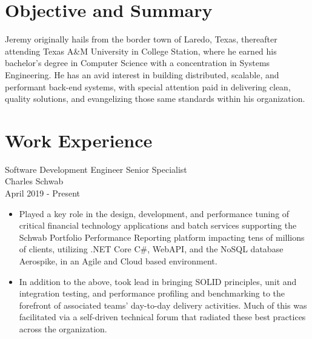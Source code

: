 \documentclass[11pt]{res} %
\begin{document}
 
 

\address{{\bf Current Address} \\   2912 Sebring Circle \\   Austin, TX
         78747  \\ (956)286-8386}
\address{{\bf Contact Information} \\ jeremycantu.com \\ github.com/jac21 \\ mail@jeremycantu.com}
 
                                             
\begin{resume}
                                               
 
\section{Objective and Summary}
   Jeremy originally hails from the border town of Laredo, Texas, thereafter attending Texas A\&M University in College Station, where he earned his bachelor's degree in Computer Science with a concentration in Systems Engineering. He has an avid interest in building distributed, scalable, and performant back-end systems, with special attention paid in delivering clean, quality solutions, and evangelizing those same standards within his organization.
 
\section{Work Experience}

Software Development Engineer Senior Specialist \\
Charles Schwab \\
April 2019 - Present
\vspace{0.2in}
   \begin{itemize} \itemsep -2pt  %
   \item Played a key role in the design, development, and performance tuning of critical financial technology applications and batch services supporting the Schwab Portfolio Performance Reporting platform impacting tens of millions of clients, utilizing .NET Core C\#, WebAPI, and the NoSQL database Aerospike, in an Agile and Cloud based environment. 
\newline
    \item In addition to the above, took lead in bringing SOLID principles, unit and integration testing, and performance profiling and benchmarking to the forefront of associated teams' day-to-day delivery activities. Much of this was facilitated via a self-driven technical forum that radiated these best practices across the organization.
 \end{itemize}


\end{resume}
\end{document}
